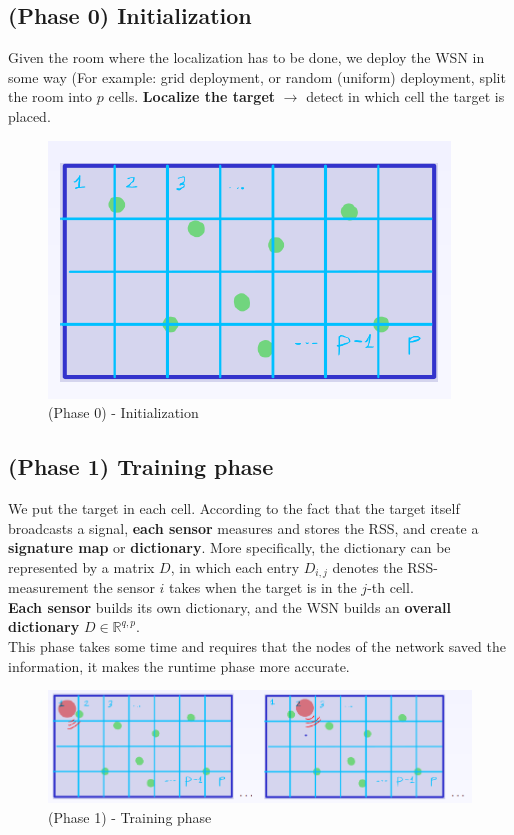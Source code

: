 \subsection{(Phase 0) Initialization }
Given the room where the localization has to be done, we deploy the WSN in some way (For example: grid deployment, or random (uniform) deployment, split the room into $p$ cells.   \textbf{Localize the target} $\longrightarrow$ detect in which cell the target is placed.

\begin{figure}[h]
    \centering
    \includegraphics{images/RSS-cells.png}
    \caption{(Phase 0) - Initialization}
    \label{fig:RSS-Cells}
\end{figure}

\subsection{(Phase 1) Training phase}
We put the target in each cell. According to the fact that the target itself broadcasts a signal, \textbf{each sensor} measures and stores the RSS, and create a \textbf{signature map} or \textbf{dictionary}. More specifically, the dictionary can be represented by a matrix $D$, in which each entry $D_{i,j} $ denotes the RSS-measurement the sensor $i$ takes when the target is in the $j$-th cell. \\
\textbf{Each sensor} builds its own dictionary, and the WSN builds an \textbf{overall dictionary} $D\in \mathbb{R}^{q,p}$.\\
This phase takes some time and requires that the nodes of the network saved the information, it makes the runtime phase more accurate. 

\begin{figure}[h]
    \centering
    \includegraphics[scale=0.8]{images/RSS-training.png}
    \caption{(Phase 1) - Training phase}
    \label{fig:enter-label}
\end{figure}

